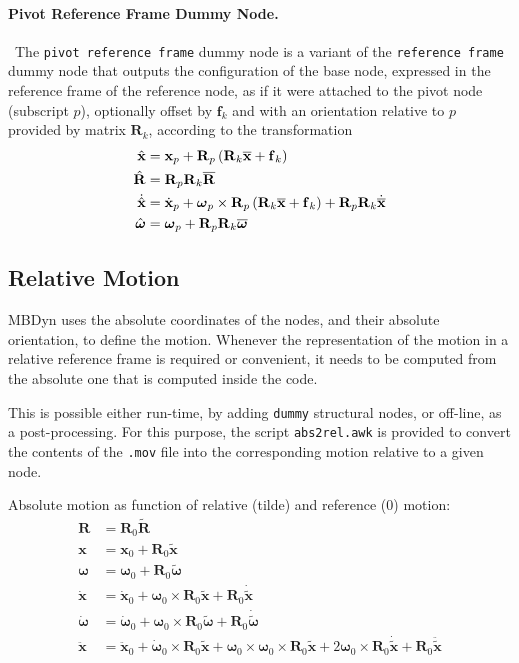 \documentclass[10pt,dvips,fleqn,subeqn]{report}
\newcommand{\T}[1]{\bm{\mathbf{#1}}}
\newcommand{\TT}[1]{\bm{\mathbf{#1}}}
\begin{document}
\paragraph{Pivot Reference Frame Dummy Node.} \
The \texttt{pivot reference frame} dummy node is a variant
of the \texttt{reference frame} dummy node that outputs
the configuration of the base node, expressed in the reference
frame of the reference node, as if it were attached to the pivot node
(subscript $p$), optionally offset by $\T{f}_k$ and with
an orientation relative to $p$ provided by matrix $\T{R}_k$,
according to the transformation
\begin{align}
	\hat{\T{x}} &= \T{x}_p + \T{R}_p\plbr{\T{R}_k \overline{\T{x}} + \T{f}_k} \\
	\hat{\T{R}} &= \T{R}_p \T{R}_k \overline{\T{R}} \\
	\dot{\hat{\T{x}}} &= \dot{\T{x}}_p
		+ \T{\omega}_p \times\T{R}_p \plbr{
			\T{R}_k \overline{\T{x}} + \T{f}_k
		} + \T{R}_p \T{R}_k \dot{\overline{\T{x}}} \\
	\hat{\T{\omega}} &= \T{\omega}_p + \T{R}_p \T{R}_k \overline{\T{\omega}}
\end{align}


\subsection{Relative Motion}
\label{sec:nodes:structural nodes:relative motion}
MBDyn uses the absolute coordinates of the nodes,
and their absolute orientation, to define the motion.
Whenever the representation of the motion in a relative reference frame
is required or convenient, it needs to be computed
from the absolute one that is computed inside the code.

This is possible either run-time, by adding \texttt{dummy} structural nodes,
or off-line, as a post-processing.
For this purpose, the script \texttt{abs2rel.awk} is provided
to convert the contents of the \texttt{.mov} file
into the corresponding motion relative to a given node.

Absolute motion as function of relative (tilde) and reference (0) motion:
\begin{subequations}
\begin{align}
	\TT{R} &= \TT{R}_0 \tilde{\TT{R}} \\
	\T{x} &= \T{x}_0 + \TT{R}_0 \tilde{\T{x}} \\
	\T{\omega} &= \T{\omega}_0 + \TT{R}_0 \tilde{\T{\omega}} \\
	\dot{\T{x}} &= \dot{\T{x}}_0
		+ \T{\omega}_0 \times \TT{R}_0 \tilde{\T{x}}
		+ \TT{R}_0 \dot{\tilde{\T{x}}}
		\label{eq:relframe:xp} \\
	\dot{\T{\omega}} &= \dot{\T{\omega}}_0
		+ \T{\omega}_0 \times \TT{R}_0 \tilde{\T{\omega}}
		+ \TT{R}_0 \dot{\tilde{\T{\omega}}} \\
	\ddot{\T{x}} &= \ddot{\T{x}}_0
		+ \dot{\T{\omega}}_0 \times \TT{R}_0 \tilde{\T{x}}
		+ \T{\omega}_0 \times \T{\omega}_0 \times \TT{R}_0 \tilde{\T{x}}
		+ 2 \T{\omega}_0 \times \TT{R}_0 \dot{\tilde{\T{x}}}
		+ \TT{R}_0 \ddot{\tilde{\T{x}}}
\end{align}
\end{subequations}
\end{document}
